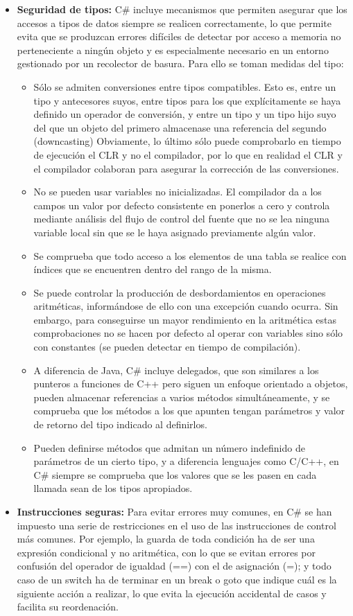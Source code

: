\begin{itemize}
		\item \textbf{Seguridad de tipos: } C\# incluye mecanismos que permiten asegurar que los accesos a tipos de datos siempre se realicen correctamente, lo que permite evita que se produzcan errores dif\'iciles de detectar por acceso a memoria no perteneciente a ning\'un objeto y es especialmente necesario en un entorno gestionado por un recolector de basura. Para ello se toman medidas del tipo: 
		\begin{itemize}
			\item S\'olo se admiten conversiones entre tipos compatibles. Esto es, entre un tipo y antecesores suyos, entre tipos para los que expl\'icitamente se haya definido un operador de conversi\'on, y entre un tipo y un tipo hijo suyo del que un objeto del primero almacenase una referencia del segundo (downcasting) Obviamente, lo \'ultimo s\'olo puede comprobarlo en tiempo de ejecuci\'on el CLR y no el compilador, por lo que en realidad el CLR y el compilador colaboran para asegurar la correcci\'on de las conversiones. 
			\item No se pueden usar variables no inicializadas. El compilador da a los campos un valor por defecto consistente en ponerlos a cero y controla mediante an\'alisis del flujo de control del fuente que no se lea ninguna variable local sin que se le haya asignado previamente alg\'un valor. 
			\item Se comprueba que todo acceso a los elementos de una tabla se realice con \'indices que se encuentren dentro del rango de la misma. 
			\item Se puede controlar la producci\'on de desbordamientos en operaciones aritm\'eticas, inform\'andose de ello con una excepci\'on cuando ocurra. Sin embargo, para conseguirse un mayor rendimiento en la aritm\'etica estas comprobaciones no se hacen por defecto al operar con variables sino s\'olo con constantes (se pueden detectar en tiempo de compilaci\'on).
			\item A diferencia de Java, C\# incluye delegados, que son similares a los punteros a funciones de C++ pero siguen un enfoque orientado a objetos, pueden almacenar referencias a varios m\'etodos simult\'aneamente, y se comprueba que los m\'etodos a los que apunten tengan par\'ametros y valor de retorno del tipo indicado al definirlos. 
			\item Pueden definirse m\'etodos que admitan un n\'umero indefinido de par\'ametros de un cierto tipo, y a diferencia lenguajes como C/C++, en C\# siempre se comprueba que los valores que se les pasen en cada llamada sean de los tipos apropiados. 
		\end{itemize}
	\item \textbf{Instrucciones seguras: } Para evitar errores muy comunes, en C\# se han impuesto una serie de restricciones en el uso de las instrucciones de control m\'as comunes. Por ejemplo, la guarda de toda condici\'on ha de ser una expresi\'on condicional y no aritm\'etica, con lo que se evitan errores por confusi\'on del operador de igualdad (==) con el de asignaci\'on (=); y todo caso de un switch ha de terminar en un break o goto que indique cu\'al es la siguiente acci\'on a realizar, lo que evita la ejecuci\'on accidental de casos y facilita su reordenaci\'on.


\end{itemize}
